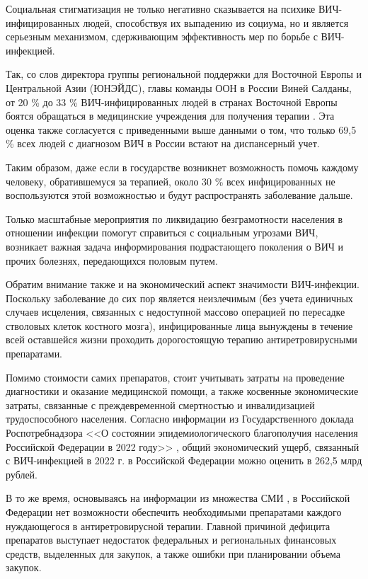     Социальная стигматизация не только негативно сказывается на психике ВИЧ-инфицированных людей, способствуя их выпадению из социума, но и является серьезным механизмом, сдерживающим эффективность мер по борьбе с ВИЧ-инфекцией.
    
    Так, со слов директора группы региональной поддержки для Восточной Европы и Центральной Азии (ЮНЭЙДС), главы команды ООН в России Виней Салданы, от 20 \% до 33 \% ВИЧ-инфицированных людей в странах Восточной Европы боятся обращаться в медицинские учреждения для получения терапии \cite{spid_center_1458_discrimination}. Эта оценка также согласуется с приведенными выше данными о том, что только 69,5 \% всех людей с диагнозом ВИЧ в России встают на диспансерный учет.

    Таким образом, даже если в государстве возникнет возможность помочь каждому человеку, обратившемуся за терапией, около 30 \% всех инфицированных не воспользуются этой возможностью и будут распространять заболевание дальше. 
    
    Только масштабные мероприятия по ликвидацию безграмотности населения в отношении инфекции помогут справиться с социальным угрозами ВИЧ, возникает важная задача информирования подрастающего поколения о ВИЧ и прочих болезнях, передающихся половым путем.

    Обратим внимание также и на экономический аспект значимости ВИЧ-инфекции. Поскольку заболевание до сих пор является неизлечимым (без учета единичных случаев исцеления, связанных с недоступной массово операцией по пересадке стволовых клеток костного мозга), инфицированные лица вынуждены в течение всей оставшейся жизни проходить дорогостоящую терапию антиретровирусными препаратами. 
    
    Помимо стоимости самих препаратов, стоит учитывать затраты на проведение диагностики и оказание медицинской помощи, а также косвенные экономические затраты, связанные с преждевременной смертностью и инвалидизацией трудоспособного населения.
    Согласно информации из Государственного доклада Роспотребнадзора <<О состоянии эпидемиологического благополучия населения Российской Федерации в 2022 году>> \cite{Доклад_Роспотребнадзор_2023}, общий экономический ущерб, связанный с ВИЧ-инфекцией в 2022 г. в Российской Федерации можно оценить в 262,5 млрд рублей.  

    В то же время, основываясь на информации из множества СМИ 
    \cite{forbes_deficit, gazeta_ru_Deficit, ria_ru_deficit, spid_center_3651_deficit}, в Российской Федерации нет возможности обеспечить необходимыми препаратами каждого нуждающегося в антиретровирусной терапии. Главной причиной дефицита препаратов выступает недостаток федеральных и региональных финансовых средств, выделенных для закупок, а также ошибки при планировании объема закупок. 
    
